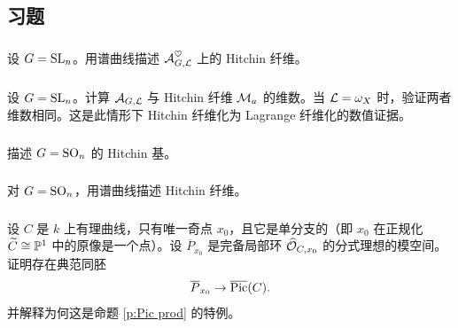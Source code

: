 \subsection{习题}

\subsubsection{} 设 $G=\textup{SL}_{n}$。用谱曲线描述 $\mathcal{A}^{\heartsuit}_{G,\mathcal{L}}$ 上的 Hitchin 纤维。

\subsubsection{} 设 $G=\textup{SL}_{n}$。计算 $\mathcal{A}_{G,\mathcal{L}}$ 与 Hitchin 纤维 $\mathcal{M}_{a}$ 的维数。当 $\mathcal{L}=\omega_{X}$ 时，验证两者维数相同。这是此情形下 Hitchin 纤维化为 Lagrange 纤维化的数值证据。

\subsubsection{} 描述 $G=\textup{SO}_{n}$ 的 Hitchin 基。

\subsubsection{} 对 $G=\textup{SO}_{n}$，用谱曲线描述 Hitchin 纤维。

\subsubsection{} 设 $C$ 是 $k$ 上有理曲线，只有唯一奇点 $x_{0}$，且它是单分支的（即 $x_{0}$ 在正规化 $\widetilde{C}\cong\mathbb{P}^{1}$ 中的原像是一个点）。设 $\overline{P}_{x_{0}}$ 是完备局部环 $\widehat{\mathcal{O}}_{C,x_{0}}$ 的分式理想的模空间。证明存在典范同胚
\begin{equation*}
\overline{P}_{x_{0}}\to \overline{\textup{Pic}}(C).
\end{equation*}
并解释为何这是命题 \ref{p:Pic prod} 的特例。
